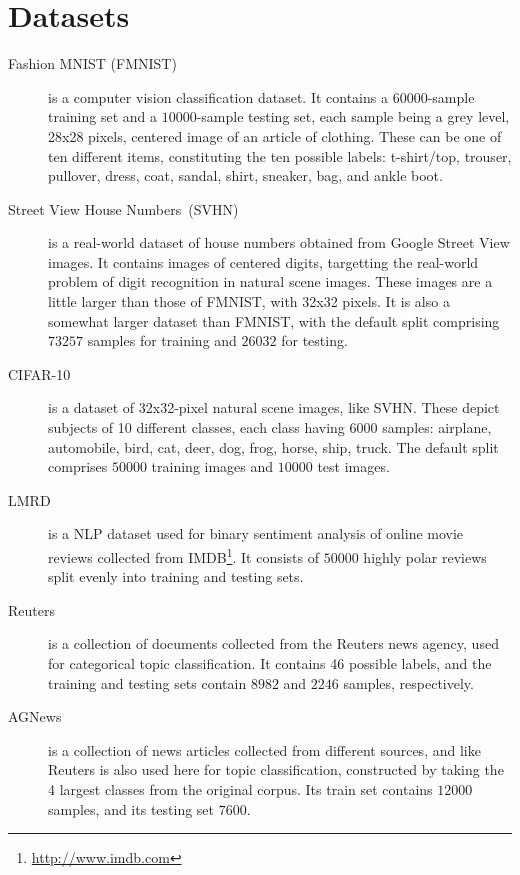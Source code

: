 \section{Datasets}

\begin{description}
\item[Fashion MNIST (FMNIST)]\cite{fashion}
is a computer vision classification dataset. It contains  a $60000$-sample training set and a $10000$-sample testing set, each sample being a grey level, 28x28 pixels, centered image of an article of clothing. These can be one of ten different items, constituting the ten possible labels: t-shirt/top, trouser, pullover, dress, coat, sandal, shirt, sneaker, bag, and ankle boot.

\item[Street View House Numbers~(SVHN)]\cite{svhn}
is a real-world dataset of house numbers obtained from Google Street View images. It contains images of centered digits, targetting the real-world problem of digit recognition in natural scene images. These images are a little larger than those of FMNIST, with 32x32 pixels. It is also a somewhat larger dataset than FMNIST, with the default split comprising $73257$ samples for training and $26032$ for testing.

\item[CIFAR-10]\cite{cifar}
is a dataset of 32x32-pixel natural scene images, like SVHN. These depict subjects of 10 different classes, each class having $6000$ samples: airplane, automobile, bird, cat, deer, dog, frog, horse, ship, truck. The default split comprises $50000$ training images and $10000$ test images.

\item[LMRD]\cite{lmrd}
is a NLP dataset used for binary sentiment analysis of online movie reviews collected from IMDB\footnote{\url{http://www.imdb.com}}. It consists of $50000$ highly polar reviews split evenly into training and testing sets.

\item[Reuters]\cite{reuters}
is a collection of documents collected from the Reuters news agency, used for categorical topic classification. It contains 46 possible labels, and the training and testing sets contain $8982$ and $2246$ samples, respectively.

\item[AGNews]\cite{agnews}
is a collection of news articles collected from different sources, and like Reuters is also used here for topic classification, constructed by taking the 4 largest classes from the original corpus. Its train set contains $12000$ samples, and its testing set $7600$.


\end{description}
